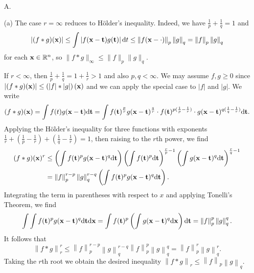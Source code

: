 \begin{lemma}
  A.
\end{lemma}

\begin{exercise}{9.2}
  (a) The case $r = \infty$ reduces to H\"{o}lder's inequality.
  Indeed, we have $\frac{1}{p} + \frac{1}{q} = 1$ and
  \[
    \left| (f * g)(\mathbf{x}) \right| \le \int \left| f(\mathbf{x}-\mathbf{t}) g(\mathbf{t}) \right| \mathrm{d} t
    \le \left\| f(\mathbf{x}-\cdot) \right\|_p \left\| g \right\|_q
    = \left\| f \right\|_p \left\| g \right\|_q
  \]
  for each $\mathbf{x} \in \mathbb{R}^n$, so $\| f*g \|_{\infty} \le \|f\|_p \|g\|_q$.

  If $r < \infty$,
  then $\frac{1}{p} + \frac{1}{q} = 1 + \frac{1}{r} > 1$
  and also $p, q < \infty$.
  We may assume $f, g \ge 0$ since
  $\left| (f*g)(\mathbf{x}) \right| \le \left( |f|*|g| \right) (\mathbf{x})$
  and we can apply the special case to $|f|$ and $|g|$.
  We write
  \[
    (f*g)(\mathbf{x}) = \int f(t) g(\mathbf{x}-\mathbf{t}) \mathrm{d} \mathbf{t}
    = \int f(\mathbf{t})^{\frac{p}{r}} g(\mathbf{x}-\mathbf{t})^{\frac{q}{r}}
    \cdot f(\mathbf{t})^{p(\frac1p - \frac1r)}
    \cdot g(\mathbf{x} - \mathbf{t})^{q(\frac1q - \frac1r)} \mathrm{d} \mathbf{t}.
  \]
  Applying the H\"{o}lder's inequality for three functions
  with exponents
  $\frac{1}{r} + (\frac{1}{p} - \frac{1}{r})
  + (\frac{1}{q} - \frac{1}{r}) = 1$,
  then raising to the $r$th power,
  we find
  \[
    \begin{aligned}
    (f*g)(\mathbf{x})^r
    &\le
    \left( \int f(\mathbf{t})^p g(\mathbf{x}-\mathbf{t})^q \mathrm{d} \mathbf{t} \right)
    \left( \int f(\mathbf{t})^p \mathrm{d} \mathbf{t} \right)^{\frac rp - 1}
    \left( \int g(\mathbf{x}-\mathbf{t})^q \mathrm{d} \mathbf{t} \right)^{\frac rq - 1} \\
    &= \left\| f \right\|_p^{r-p} \left\| g \right\|_{q}^{r-q}
      \left( \int f(\mathbf{t})^p g(\mathbf{x}-\mathbf{t})^q \mathrm{d} \mathbf{t} \right).
    \end{aligned}
  \]
  Integrating the term in parentheses with respect to $x$
  and applying Tonelli's Theorem, we find
  \[
    \int \int f(\mathbf{t})^p g(\mathbf{x}-\mathbf{t})^q \mathrm{d} \mathbf{t} \mathrm{d} \mathbf{x}
    = \int f(\mathbf{t})^p \left( \int g(\mathbf{x}-\mathbf{t})^q \mathrm{d} \mathbf{x} \right) \mathrm{d} \mathbf{t}
    = \left\| f \right\|_p^p \left\| g \right\|_q^q.
  \]
  It follows that
  \[
    \left\| f*g \right\|_r^r \le
    \left\| f \right\|_p^{r-p} \left\| g \right\|_{q}^{r-q}
    \left\| f \right\|_p^p \left\| g \right\|_q^q
    = \left\| f \right\|_p^r \left\| g \right\|_q^r.
  \]
  Taking the $r$th root we obtain the desired inequality
  $\left\| f*g \right\|_r \le \left\| f \right\|_p \left\| g \right\|_q$.


\end{exercise}
